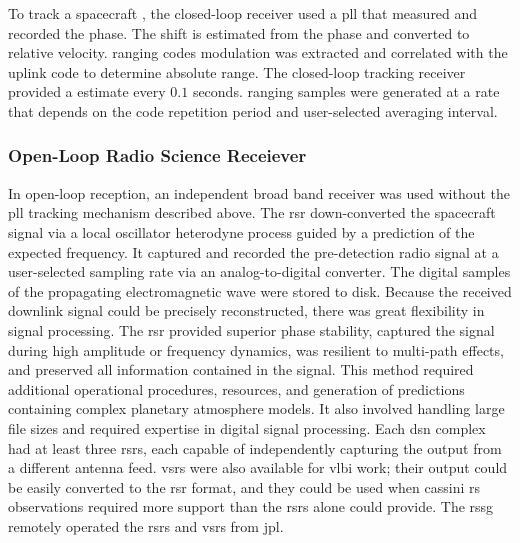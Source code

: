 \documentclass[oneside]{book}
\theoremstyle{mystyle}
\begin{document}
To track a spacecraft , the \gls{closed-loop} receiver used a \gls{pll} that measured and recorded the  \gls{phase}. The  shift is estimated from the phase and converted to relative velocity. \Glspl{ranging code} \gls{modulation} was extracted and correlated with the \gls{uplink} code to determine \gls{absolute range}. The \gls{closed-loop} tracking receiver provided a  estimate every $0.1$ seconds. \Glspl{ranging sample} were generated at a rate that depends on the code repetition period and user-selected averaging interval.

\subsubsection{\footnotesize Open-Loop Radio Science Receiever \label{subsubsec:usr_open_loop_rad_sci_rec}}

In \gls{open-loop} reception, an independent broad band receiver was used without the \gls{pll} tracking mechanism described above. The \gls{rsr} down-converted the spacecraft signal via a local \gls{oscillator} \gls{heterodyne} process guided by a prediction of the expected \gls{frequency}. It captured and recorded the pre-detection radio signal at a user-selected \gls{sampling rate} via an \gls{analog-to-digital converter}. The digital samples of the propagating electromagnetic wave were stored to disk. Because the received \gls{downlink} signal could be precisely reconstructed, there was great flexibility in signal processing. The \gls{rsr} provided superior \gls{phase stability}, captured the signal during high \gls{amplitude} or \gls{frequency} dynamics, was resilient to \glspl{multi-path effect}, and preserved all information contained in the signal. This method required additional operational procedures, resources, and generation of predictions containing complex planetary atmosphere models. It also involved handling large file sizes and required expertise in digital signal processing. Each \gls{dsn} complex had at least three \glspl{rsr}, each capable of independently capturing the output from a different antenna feed.
\glspl{vsr} were also available for \gls{vlbi} work; their output could be easily converted to the \gls{rsr} format, and they could be used when \gls{cassini} \gls{rs} observations required more support than the \glspl{rsr} alone could provide. The \gls{rssg} remotely operated the \glspl{rsr} and \gls{vsr}s from \gls{jpl}.
\end{document}
